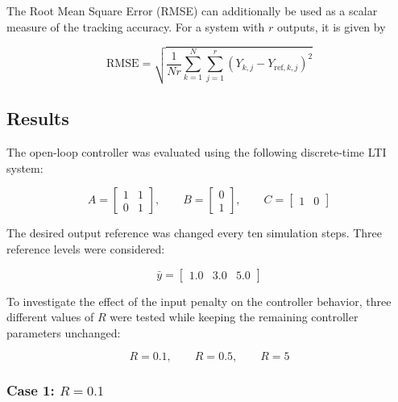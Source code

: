 The Root Mean Square Error (RMSE) can additionally be used as a scalar measure of the tracking accuracy. For a system with \(r\) outputs, it is given by

\begin{equation}
    \mathrm{RMSE}
    =
    \sqrt{
    \frac{1}{Nr}
    \sum_{k=1}^{N}
    \sum_{j=1}^{r}
    \left(
        Y_{k,j}-Y_{\mathrm{ref},k,j}
    \right)^2
    }
    \label{eq:open_loop_rmse}
\end{equation}

\subsection{Results}
\label{subsec:open_loop_results}

The open-loop controller was evaluated using the following discrete-time LTI system:

\begin{equation}
    A =
    \begin{bmatrix}
        1 & 1 \\
        0 & 1
    \end{bmatrix},
    \qquad
    B =
    \begin{bmatrix}
        0 \\
        1
    \end{bmatrix},
    \qquad
    C =
    \begin{bmatrix}
        1 & 0
    \end{bmatrix}
    \label{eq:open_loop_example_system}
\end{equation}

The desired output reference was changed every ten simulation steps. Three reference levels were considered:

\begin{equation}
    \bar{y}
    =
    \begin{bmatrix}
        1.0 & 3.0 & 5.0
    \end{bmatrix}
\end{equation}

To investigate the effect of the input penalty on the controller behavior, three different values of \(R\) were tested while keeping the remaining controller parameters unchanged:

\begin{equation}
    R = 0.1,
    \qquad
    R = 0.5,
    \qquad
    R = 5
\end{equation}

\subsubsection*{Case 1: \(R=0.1\)}



